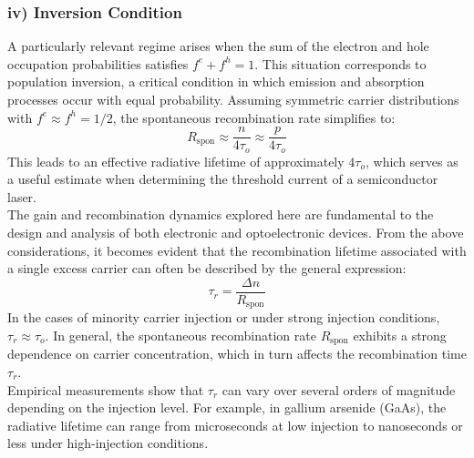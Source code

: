 \subsubsection*{iv) Inversion Condition}
A particularly relevant regime arises when the sum of the electron and hole occupation probabilities satisfies \( f^e + f^h = 1 \). This situation corresponds to population inversion, a critical condition in which emission and absorption processes occur with equal probability. Assuming symmetric carrier distributions with \( f^e \approx f^h = 1/2 \), the spontaneous recombination rate simplifies to:
\begin{equation}
	R_{\text{spon}} \approx \frac{n}{4 \tau_o} \approx \frac{p}{4 \tau_o}
\end{equation}
This leads to an effective radiative lifetime of approximately \( 4\tau_o \), which serves as a useful estimate when determining the threshold current of a semiconductor laser.\\
The gain and recombination dynamics explored here are fundamental to the design and analysis of both electronic and optoelectronic devices. From the above considerations, it becomes evident that the recombination lifetime associated with a single excess carrier can often be described by the general expression:
\begin{equation}
	\tau_r = \frac{\Delta n}{R_{\text{spon}}}
\end{equation}
In the cases of minority carrier injection or under strong injection conditions, \( \tau_r \approx \tau_o \). In general, the spontaneous recombination rate \( R_{\text{spon}} \) exhibits a strong dependence on carrier concentration, which in turn affects the recombination time \( \tau_r \).\\
Empirical measurements show that \( \tau_r \) can vary over several orders of magnitude depending on the injection level. For example, in gallium arsenide (GaAs), the radiative lifetime can range from microseconds at low injection to nanoseconds or less under high-injection conditions.


